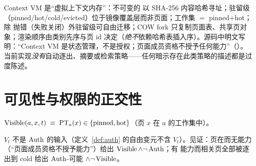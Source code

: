 Context VM 是“虚拟上下文内存”：不可变的  以 SHA-256 内容哈希寻址；驻留级（pinned/hot/cold/evicted）位于镜像覆盖层而非页面；工作集 $=$ pinned+hot；除  抛错（失败关闭）外驻留级可自由迁移；COW fork 只复制页面表、共享页对象；渲染顺序由类别先序与页 id 决定（\emph{绝不}依赖哈希表插入序）。源码中明文写明：“Context VM 是状态管理，不是授权；页面成员资格不授予任何能力”（）。当前实现\emph{没有}自动逐出、摘要或检索策略——任何暗示存在此类策略的描述都是过度陈述。

\section{可见性与权限的正交性}

\begin{definition}[可见性]\label{def:visible}
$\operatorname{Visible}(a,x,t)\;\equiv\;\mathrm{PT}_a(x)\in\{\text{pinned},\text{hot}\}$（页 $x$ 在 $a$ 的工作集中）。
\end{definition}

\begin{proposition}\label{prop:orthvis}
$V_t$ 不是 $\operatorname{Auth}$ 的输入（定义~\ref{def:auth} 的自由变元不含 $V_t$）。见证：页在而无能力（“页面成员资格不授予能力”）给出 $\operatorname{Visible}\wedge\neg\operatorname{Auth}$；有  能力而相关页全部被逐出到 cold 给出 $\operatorname{Auth}$-可能 $\wedge\neg\operatorname{Visible}$。
\end{proposition}

